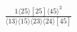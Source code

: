 \documentclass[varwidth, border=5pt]{standalone}
\begin{document}
\begin{my}
$\begin{gathered}
\scriptscriptstyle\frac{1⟨25⟩[25]⟨45⟩^2}{⟨13⟩⟨15⟩⟨23⟩⟨24⟩[45]}
\end{gathered}$
\end{my}
\end{document}
